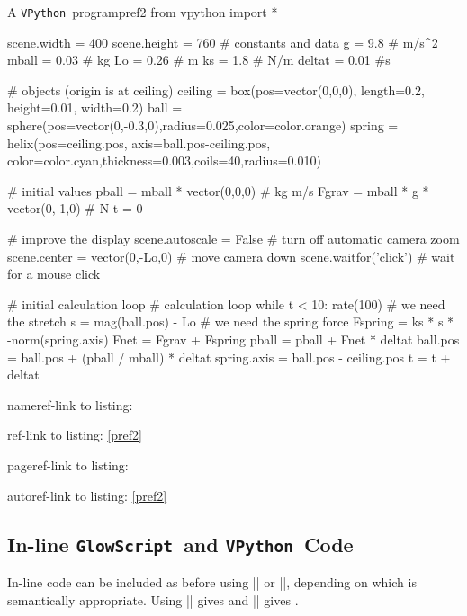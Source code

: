 \documentclass{article}
\newcommand*{\GlowScript}{\texttt{GlowScript}}        %
\newcommand*{\VPython}{\texttt{VPython}}              %
\begin{document}
\begin{glowscriptblock}{A \VPython\ program}{pref2}
from vpython import *

scene.width = 400
scene.height = 760
# constants and data
g = 9.8       # m/s^2
mball = 0.03  # kg
Lo = 0.26     # m
ks = 1.8      # N/m
deltat = 0.01 #s 

# objects (origin is at ceiling)
ceiling = box(pos=vector(0,0,0), length=0.2, height=0.01, width=0.2)
ball = sphere(pos=vector(0,-0.3,0),radius=0.025,color=color.orange)
spring = helix(pos=ceiling.pos, axis=ball.pos-ceiling.pos,
         color=color.cyan,thickness=0.003,coils=40,radius=0.010)

# initial values
pball = mball * vector(0,0,0)      # kg m/s
Fgrav = mball * g * vector(0,-1,0) # N
t = 0

# improve the display
scene.autoscale = False        # turn off automatic camera zoom
scene.center = vector(0,-Lo,0) # move camera down
scene.waitfor('click')         # wait for a mouse click

# initial calculation loop
# calculation loop
while t < 10:
    rate(100)
    # we need the stretch
    s = mag(ball.pos) - Lo
    # we need the spring force
    Fspring = ks * s * -norm(spring.axis)
    Fnet = Fgrav + Fspring
    pball = pball + Fnet * deltat
    ball.pos = ball.pos + (pball / mball) * deltat
    spring.axis = ball.pos - ceiling.pos
    t = t + deltat
\end{glowscriptblock}

nameref-link to listing: 

ref-link to listing: \ref{pref2}

pageref-link to listing: \pageref{pref2}

autoref-link to listing: \autoref{pref2}

\newpage
\subsection{In-line \GlowScript\ and \VPython\ Code}
In-line code can be included as before using || or 
||, depending on which is semantically appropriate. Using \newline
|| gives \newline
{} and \newline
|| gives \newline
{}.
\end{document}

